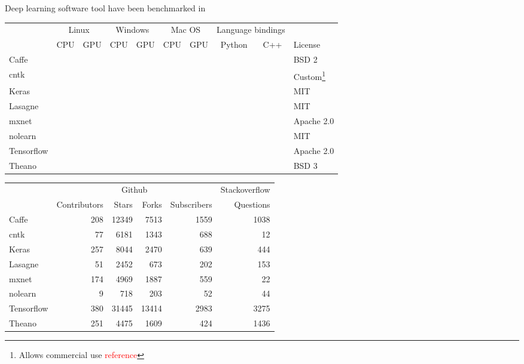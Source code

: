 \documentclass[a4paper, 11pt, table]{article}
\newcommand{\cmark}{\ding{51}}%
\newcommand{\xmark}{\ding{55}}%
\newcommand{\ymark}{\textcolor{clyes}{\cmark}}%
\newcommand{\nmark}{\textcolor{clno}{\xmark}}%
\begin{document}
Deep learning software tool have been benchmarked in~\cite{benchmarking_dl_tools}

\begin{landscape}
\begin{center}
\begin{tabular}{lccccccccl}
\hline 
 & \multicolumn{2}{c}{\cellcolor{linux}Linux} & \multicolumn{2}{c}{\cellcolor{windows}Windows} & \multicolumn{2}{c}{\cellcolor{macos}Mac OS} & \multicolumn{2}{c}{Language bindings} &  \\ 
 & \cellcolor{linux}CPU & \cellcolor{linux}GPU & \cellcolor{windows}CPU & \cellcolor{windows}GPU & \cellcolor{macos}CPU & \cellcolor{macos}GPU & Python & C++ & License\\ 
\hline 
Caffe & \ymark & \ymark & \ymark & \ymark & \ymark & \ymark & \ymark & \nmark & BSD 2\\ 
cntk & \ymark & \ymark & \ymark & \ymark & \nmark & \nmark & \ymark & \ymark & Custom\footnote{Allows commercial use \textcolor{red}{reference}} \\ 
Keras & \ymark & \ymark & \ymark & \ymark & \ymark & \ymark & \ymark & \nmark & MIT \\ 
Lasagne & \ymark & \ymark & \ymark & \ymark & \ymark & \ymark & \ymark & \nmark & MIT \\ 
mxnet & \ymark & \ymark & \ymark & \ymark & \ymark & \ymark & \ymark & \ymark & Apache 2.0 \\ 
nolearn & \ymark & \ymark & \ymark & \ymark & \ymark & \ymark & \ymark & \nmark & MIT \\ 
Tensorflow & \ymark & \ymark & \nmark & \nmark & \ymark & \nmark & \ymark & \ymark & Apache 2.0 \\ 
Theano & \ymark & \ymark & \ymark & \ymark & \ymark & \ymark & \ymark & \nmark & BSD 3\\ 
\end{tabular} 
\end{center}

\begin{center}
\begin{tabular}{lrrrrr}
\hline 
 & \multicolumn{4}{c}{Github} & Stackoverflow \\ 
 & Contributors & Stars & Forks & Subscribers & Questions \\ 
\hline 
Caffe & 208 & 12349 & 7513 & 1559 & 1038 \\ 
cntk & 77 & 6181 & 1343 & 688 & 12 \\ 
Keras & 257 & 8044 & 2470 & 639 & 444 \\ 
Lasagne & 51 & 2452 & 673 & 202 & 153 \\ 
mxnet & 174 & 4969 & 1887 & 559 & 22 \\ 
nolearn & 9 & 718 & 203 & 52 & 44 \\ 
Tensorflow & 380 & 31445 & 13414 & 2983 & 3275 \\ 
Theano & 251 & 4475 & 1609 & 424 & 1436 \\ 
\end{tabular} 
\end{center}




\end{landscape}
\end{document}
